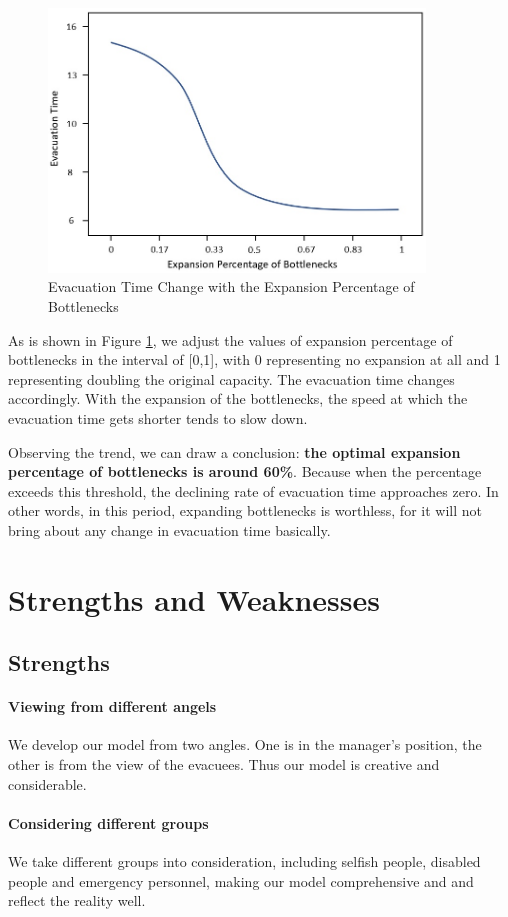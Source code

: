 \documentclass[a4paper,12pt]{article}
\begin{document}
\begin{figure} [H]
\centering
\includegraphics[width=10cm]{expansion.jpg}
\caption{Evacuation Time Change with the Expansion Percentage of Bottlenecks}
\label{fig9}
\end{figure}
As is shown in Figure \ref{fig9}, we adjust the values of expansion percentage of bottlenecks in the interval of [0,1], with 0 representing no expansion at all and 1 representing doubling the original capacity. The evacuation time changes accordingly. With the expansion of the bottlenecks, the speed at which the evacuation time gets shorter tends to slow down.

Observing the trend, we can draw a conclusion: \textbf{the optimal expansion percentage of bottlenecks is around 60\%}. Because when the percentage exceeds this threshold, the declining rate of evacuation time approaches zero. In other words, in this period, expanding bottlenecks is worthless, for it will not bring about any change in evacuation time basically.

\section{Strengths and Weaknesses}
\subsection{Strengths}
\paragraph{Viewing from different angels} We develop our model from two angles. One is in the manager's position, the other is from the view of the evacuees. Thus our model is creative and considerable.
\paragraph{Considering different groups} We take different groups into consideration, including selfish people, disabled people and emergency personnel, making our model
comprehensive and and reflect the reality well.
\end{document}
